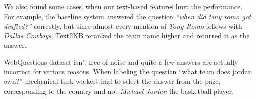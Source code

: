 We also found some cases, when our text-based features hurt the performance.
For example, the baseline system answered the question \textit{``when did tony romo got drafted?''} correctly, but since almost every mention of \textit{Tony Romo} follows with \textit{Dallas Cowboys}, Text2KB reranked the team name higher and returned it as the answer.

WebQuestions dataset isn't free of noise and quite a few answers are actually incorrect for various reasons.
When labeling the question ``what team does jordan own?'' mechanical turk workers had to select the answer from the page, corresponding to the country and not \textit{Michael Jordan} the basketball player.
